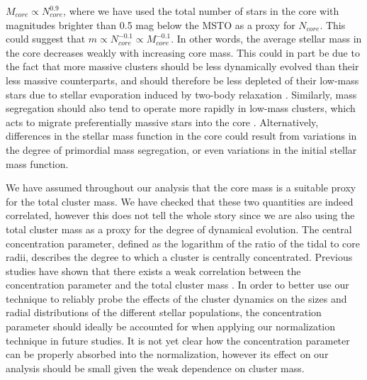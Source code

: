 $M_{core} \propto N_{core}^{0.9}$, where we have used the total number
of stars in the core with magnitudes brighter than 0.5 mag below the
MSTO as a proxy for $N_{core}$.  This could suggest that $m \propto
N_{core}^{-0.1} \propto M_{core}^{-0.1}$.  In other words, the
average stellar mass in the core decreases weakly with increasing core
mass.  This could in part be due to the fact that more massive clusters 
should be less dynamically evolved than their less massive
counterparts, and should therefore be less depleted of their low-mass
stars due to stellar evaporation induced by two-body relaxation
\citep[e.g.][]{ambartsumian38, spitzer58, henon60, demarchi10}.
Similarly, mass 
segregation should also tend to operate more rapidly in low-mass
clusters, which acts to migrate preferentially massive stars into the
core \citep{spitzer69, spitzer71, farouki82, shara95, king95,
  meylan97}.  
Alternatively, differences in the stellar mass function in the 
core could result from variations in the degree of primordial mass
segregation, or even variations in the initial stellar mass function.

We have assumed throughout our analysis that the core mass is a
suitable proxy for the total cluster mass.  We have checked that these
two quantities are 
indeed correlated, however this does not tell the whole story since we
are also using the total cluster mass as a proxy for the degree of
dynamical evolution.  The central concentration 
parameter, defined as the logarithm of the ratio of the tidal to core
radii, describes the degree to which a cluster is centrally
concentrated.  Previous studies have shown that there exists a weak
correlation between the concentration parameter and the total cluster
mass \citep[e.g.][]{djorgovski94, mclaughlin00}.  In order to better use our
technique to reliably probe the effects of the cluster
dynamics on the sizes and radial distributions of the different
stellar populations, the concentration parameter should ideally be
accounted for when applying our normalization technique in future
studies.  It is not yet clear how the concentration parameter can be
properly absorbed into the normalization, however its effect on our
analysis should be small given the weak dependence on cluster mass.  

